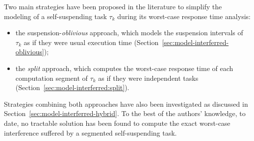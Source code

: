 
\label{sec:model-interferred}

Two main strategies have been proposed in the literature to simplify the modeling of a self-suspending task $\tau_k$ during its worst-case response time analysis:
\begin{itemize}
\item the suspension-\emph{oblivious} approach, which models the suspension intervals of $\tau_k$ as if they were usual execution time (Section~\ref{sec:model-interferred-oblivious});
\item the \emph{split} approach, which computes the worst-case response time of each computation segment of $\tau_k$ as if they were independent tasks (Section~\ref{sec:model-interferred:split}).
\end{itemize}
Strategies combining both approaches have also been investigated as discussed in Section~\ref{sec:model-interferred-hybrid}.
 To the best of the authors' knowledge, to date, no tractable solution has been found to compute the exact worst-case interference suffered by a segmented self-suspending task. 




